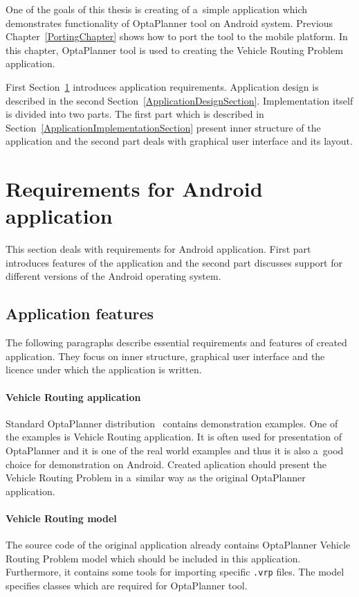One of the goals of this thesis is creating of a~simple application which demonstrates functionality of OptaPlanner tool
on Android system. Previous Chapter~\ref{PortingChapter} shows how to port the tool to the mobile platform. In this
chapter, OptaPlanner tool is used to creating the Vehicle Routing Problem application.

First Section~\ref{RequirementsApplicationSection} introduces application requirements. Application design is described
in the second Section~\ref{ApplicationDesignSection}. Implementation itself is divided into two parts. The first part
which is described in Section~\ref{ApplicationImplementationSection} present inner structure of the application and the
second part deals with graphical user interface and its layout.

\section{Requirements for Android application}\label{RequirementsApplicationSection}
This section deals with requirements for Android application. First part introduces features of the application and the
second part discusses support for different versions of the Android operating system.

\subsection{Application features}\label{FeaturesSection}
The following paragraphs describe essential requirements and features of created application. They focus on inner
structure, graphical user interface and the licence under which the application is written.

\paragraph{Vehicle Routing application}
Standard OptaPlanner distribution~\cite{OptaPlannerDistribution} contains demonstration examples. One of the examples is
Vehicle Routing application. It is often used for presentation of OptaPlanner and it is one of the real world examples
and thus it is also a~good choice for demonstration on Android. Created aplication should present the Vehicle Routing
Problem in a~similar way as the original OptaPlanner application.

\paragraph{Vehicle Routing model}
The source code of the original application already contains OptaPlanner Vehicle Routing Problem model which should be
included in this application. Furthermore, it contains some tools for importing specific \texttt{.vrp} files. The model
specifies classes which are required for OptaPlanner tool.

